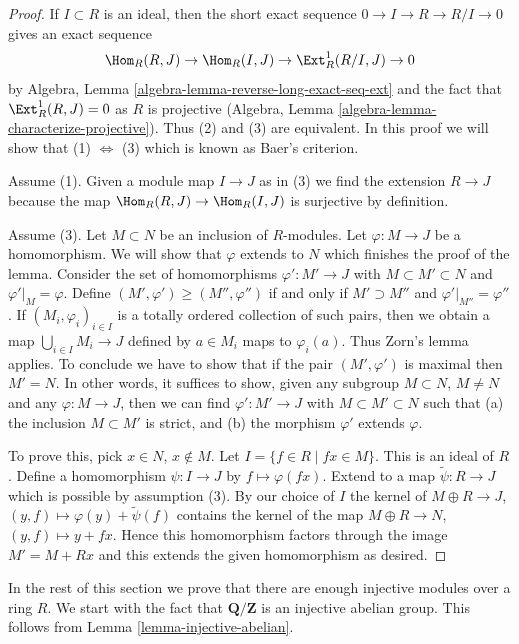 \begin{proof}
If $I \subset R$ is an ideal, then the short exact sequence
$0 \to I \to R \to R/I \to 0$ gives an exact sequence
$$
\Hom_R(R, J) \to
\Hom_R(I, J) \to
\Ext^1_R(R/I, J) \to 0
$$
by Algebra, Lemma \ref{algebra-lemma-reverse-long-exact-seq-ext}
and the fact that $\Ext^1_R(R, J) = 0$ as $R$ is projective
(Algebra, Lemma \ref{algebra-lemma-characterize-projective}).
Thus (2) and (3) are equivalent. In this proof
we will show that (1) $\Leftrightarrow$ (3) which is known
as Baer's criterion.

\medskip\noindent
Assume (1). Given a module map $I \to J$ as in (3) we find
the extension $R \to J$ because the map
$\Hom_R(R, J) \to \Hom_R(I, J)$ is surjective
by definition.

\medskip\noindent
Assume (3). Let $M \subset N$ be an inclusion of $R$-modules.
Let $\varphi : M \to J$ be a homomorphism. We will show that $\varphi$
extends to $N$ which finishes the proof of the lemma.
Consider the set of homomorphisms $\varphi' : M' \to J$
with $M \subset M' \subset N$ and $\varphi'|_M = \varphi$.
Define $(M', \varphi') \geq (M'', \varphi'')$ if
and only if $M' \supset M''$ and $\varphi'|_{M''} = \varphi''$.
If $(M_i, \varphi_i)_{i \in I}$ is a totally
ordered collection of such pairs, then we obtain a map
$\bigcup_{i \in I} M_i \to J$ defined by $a \in M_i$
maps to $\varphi_i(a)$. Thus Zorn's lemma applies.
To conclude we have to show that if the pair
$(M', \varphi')$ is maximal then $M' = N$.
In other words, it suffices to show, given
any subgroup $M \subset N$, $M \not = N$ and
any $\varphi : M \to J$, then we can find
$\varphi' : M' \to J$ with $M \subset M' \subset N$
such that (a) the inclusion $M \subset M'$ is strict, and
(b) the morphism $\varphi'$ extends $\varphi$.

\medskip\noindent
To prove this, pick $x \in N$, $x \not \in M$.
Let $I = \{f \in R \mid fx \in M\}$. This is an ideal of $R$.
Define a homomorphism $\psi : I \to J$ by $f \mapsto \varphi(fx)$.
Extend to a map $\tilde\psi : R \to J$ which is possible by assumption (3).
By our choice of $I$ the kernel of
$M \oplus R \to J$, $(y, f) \mapsto \varphi(y) + \tilde\psi(f)$
contains the kernel of the map $M \oplus R \to N$,
$(y, f) \mapsto y + fx$. Hence this homomorphism factors
through the image $M' = M + Rx$ and this extends the given homomorphism
as desired.
\end{proof}

\noindent
In the rest of this section we prove that there are enough injective
modules over a ring $R$. We start with the fact that $\mathbf{Q}/\mathbf{Z}$
is an injective abelian group. This follows from
Lemma \ref{lemma-injective-abelian}.

